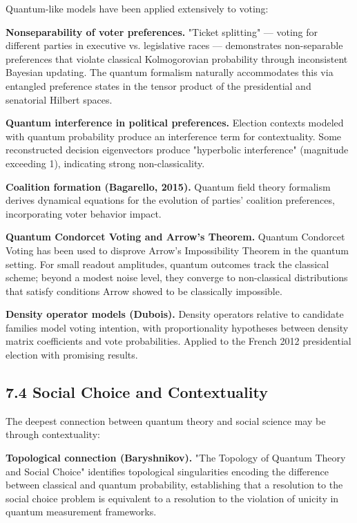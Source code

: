 \documentclass[11pt]{article}
\begin{document}
Quantum-like models have been applied extensively to voting:

\textbf{Nonseparability of voter preferences.} "Ticket splitting" --- voting for
different parties in executive vs. legislative races --- demonstrates non-separable
preferences that violate classical Kolmogorovian probability through inconsistent
Bayesian updating. The quantum formalism naturally accommodates this via entangled
preference states in the tensor product of the presidential and senatorial
Hilbert spaces.

\textbf{Quantum interference in political preferences.} Election contexts modeled with
quantum probability produce an interference term for contextuality. Some
reconstructed decision eigenvectors produce "hyperbolic interference" (magnitude
exceeding 1), indicating strong non-classicality.

\textbf{Coalition formation (Bagarello, 2015).} Quantum field theory formalism derives
dynamical equations for the evolution of parties' coalition preferences,
incorporating voter behavior impact.

\textbf{Quantum Condorcet Voting and Arrow's Theorem.} Quantum Condorcet Voting has
been used to disprove Arrow's Impossibility Theorem in the quantum setting. For
small readout amplitudes, quantum outcomes track the classical scheme; beyond a
modest noise level, they converge to non-classical distributions that satisfy
conditions Arrow showed to be classically impossible.

\textbf{Density operator models (Dubois).} Density operators relative to candidate
families model voting intention, with proportionality hypotheses between density
matrix coefficients and vote probabilities. Applied to the French 2012
presidential election with promising results.
\subsection{7.4 Social Choice and Contextuality}
\label{sec:org54006d5}

The deepest connection between quantum theory and social science may be through
contextuality:

\textbf{Topological connection (Baryshnikov).} "The Topology of Quantum Theory and Social
Choice" identifies topological singularities encoding the difference between
classical and quantum probability, establishing that a resolution to the social
choice problem is equivalent to a resolution to the violation of unicity in
quantum measurement frameworks.
\end{document}
